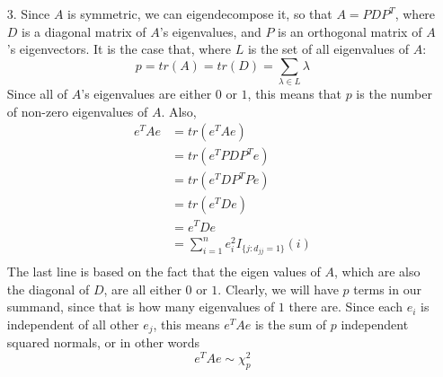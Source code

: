 \documentclass[11pt]{article}
\theoremstyle{definition}
\begin{document}
\begin{itemize}
    \item[3.]
        Since $A$ is symmetric, we can eigendecompose it, so that $A=PDP^T$, where $D$ is a diagonal matrix of $A$'s eigenvalues, and $P$ is an orthogonal matrix of $A$'s eigenvectors. It is the case that, where $L$ is the set of all eigenvalues of $A$:
        \[ p=tr(A)=tr(D)=\sum_{\lambda\in L} \lambda \]
        Since all of $A$'s eigenvalues are either $0$ or $1$, this means that $p$ is the number of non-zero eigenvalues of $A$. Also,
        \begin{align*}
            e^TAe &= tr(e^TAe) \\
                  &= tr(e^TPDP^Te) \\
                  &= tr(e^TDP^TPe) \\
                  &= tr(e^TDe) \\
                  &= e^TDe  \\
                  &= \sum_{i=1}^n e_i^2 I_{\{j:d_{jj}=1\}}(i) \\
        \end{align*}
        The last line is based on the fact that the eigen values of $A$, which are also the diagonal of $D$, are all either $0$ or $1$. Clearly, we will have $p$ terms in our summand, since that is how many eigenvalues of $1$ there are. Since each $e_i$ is independent of all other $e_j$, this means $e^TAe$ is the sum of $p$ independent squared normals, or in other words
        \[ e^TAe \sim \chi_p^2\]


\end{itemize}
\end{document}
